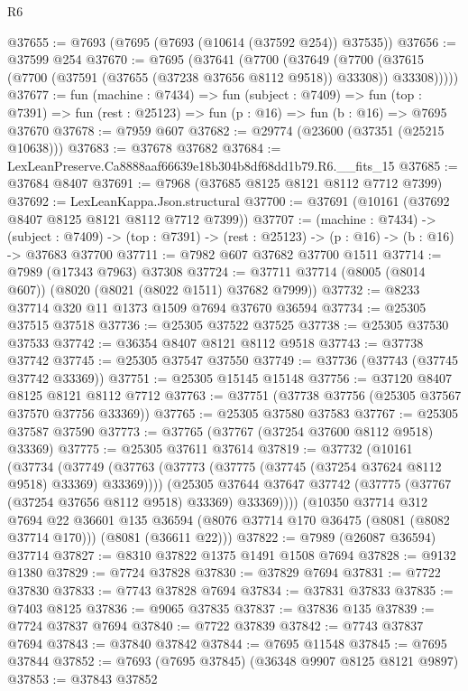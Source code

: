 \begin{lexlean}{R6}
\begin{coremodule}
@37655 := @7693 (@7695 (@7693 (@10614 (@37592 @254)) @37535))
@37656 := @37599 @254
@37670 := @7695
    (@37641
      (@7700
        (@37649
          (@7700 (@37615 (@7700 (@37591 (@37655 (@37238 @37656 @8112 @9518)) @33308)) @33308)))))
@37677 := fun (machine : @7434) =>
  fun (subject : @7409) =>
  fun (top : @7391) => fun (rest : @25123) => fun (p : @16) => fun (b : @16) => @7695 @37670
@37678 := @7959 @607
@37682 := @29774 (@23600 (@37351 (@25215 @10638)))
@37683 := @37678 @37682
@37684 := LexLeanPreserve.Ca8888aaf66639e18b304b8df68dd1b79.R6.__fits_15
@37685 := @37684 @8407
@37691 := @7968 (@37685 @8125 @8121 @8112 @7712 @7399)
@37692 := LexLeanKappa.Json.structural
@37700 := @37691 (@10161 (@37692 @8407 @8125 @8121 @8112 @7712 @7399))
@37707 := (machine : @7434) ->
  (subject : @7409) -> (top : @7391) -> (rest : @25123) -> (p : @16) -> (b : @16) -> @37683 @37700
@37711 := @7982 @607 @37682 @37700 @1511
@37714 := @7989 (@17343 @7963) @37308
@37724 := @37711 @37714 (@8005 (@8014 @607)) (@8020 (@8021 (@8022 @1511) @37682 @7999))
@37732 := @8233 @37714 @320 @11 @1373 @1509 @7694 @37670 @36594
@37734 := @25305 @37515 @37518
@37736 := @25305 @37522 @37525
@37738 := @25305 @37530 @37533
@37742 := @36354 @8407 @8121 @8112 @9518
@37743 := @37738 @37742
@37745 := @25305 @37547 @37550
@37749 := @37736 (@37743 (@37745 @37742 @33369))
@37751 := @25305 @15145 @15148
@37756 := @37120 @8407 @8125 @8121 @8112 @7712
@37763 := @37751 (@37738 @37756 (@25305 @37567 @37570 @37756 @33369))
@37765 := @25305 @37580 @37583
@37767 := @25305 @37587 @37590
@37773 := @37765 (@37767 (@37254 @37600 @8112 @9518) @33369)
@37775 := @25305 @37611 @37614
@37819 := @37732
    (@10161
      (@37734
        (@37749 (@37763 (@37773 (@37775 (@37745 (@37254 @37624 @8112 @9518) @33369) @33369))))
        (@25305 @37644 @37647 @37742 (@37775 (@37767 (@37254 @37656 @8112 @9518) @33369) @33369))))
    (@10350
      @37714
      @312
      @7694
      @22
      @36601
      @135
      @36594
      (@8076 @37714 @170 @36475 (@8081 (@8082 @37714 @170)))
      (@8081 (@36611 @22)))
@37822 := @7989 (@26087 @36594) @37714
@37827 := @8310 @37822 @1375 @1491 @1508 @7694
@37828 := @9132 @1380
@37829 := @7724 @37828
@37830 := @37829 @7694
@37831 := @7722 @37830
@37833 := @7743 @37828 @7694
@37834 := @37831 @37833
@37835 := @7403 @8125
@37836 := @9065 @37835
@37837 := @37836 @135
@37839 := @7724 @37837 @7694
@37840 := @7722 @37839
@37842 := @7743 @37837 @7694
@37843 := @37840 @37842
@37844 := @7695 @11548
@37845 := @7695 @37844
@37852 := @7693 (@7695 @37845) (@36348 @9907 @8125 @8121 @9897)
@37853 := @37843 @37852

\end{coremodule}
\end{lexlean}
